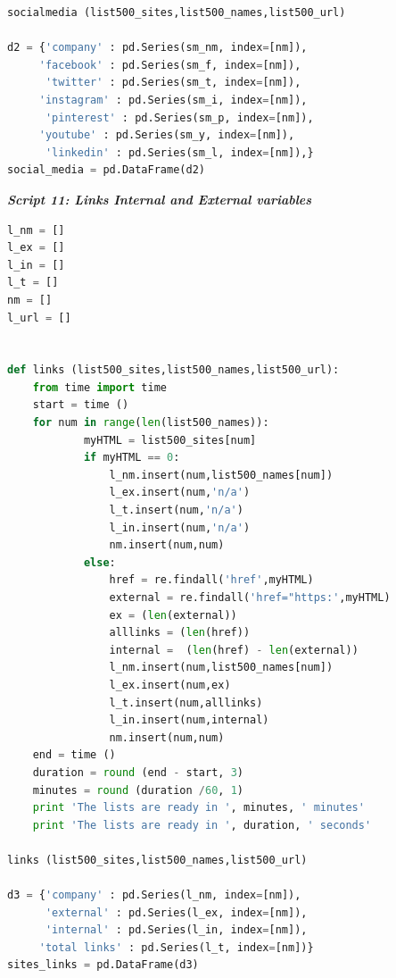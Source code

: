\documentclass{article}
\begin{document}
\begin{lstlisting}[language=Python]
socialmedia (list500_sites,list500_names,list500_url)

d2 = {'company' : pd.Series(sm_nm, index=[nm]),
     'facebook' : pd.Series(sm_f, index=[nm]),
      'twitter' : pd.Series(sm_t, index=[nm]),
     'instagram' : pd.Series(sm_i, index=[nm]),
      'pinterest' : pd.Series(sm_p, index=[nm]),
     'youtube' : pd.Series(sm_y, index=[nm]),
      'linkedin' : pd.Series(sm_l, index=[nm]),}
social_media = pd.DataFrame(d2) 
\end{lstlisting}

\begin{center}
\textit{\textbf{Script 11: Links Internal and External variables}} \label{p11}
\end{center}
\begin{lstlisting}[language=Python]
l_nm = []
l_ex = []
l_in = []
l_t = []
nm = []
l_url = []


def links (list500_sites,list500_names,list500_url):
    from time import time    
    start = time ()
    for num in range(len(list500_names)):        
            myHTML = list500_sites[num]
            if myHTML == 0:
                l_nm.insert(num,list500_names[num])            
                l_ex.insert(num,'n/a')
                l_t.insert(num,'n/a')
                l_in.insert(num,'n/a')
                nm.insert(num,num)                
            else: 
                href = re.findall('href',myHTML)
                external = re.findall('href="https:',myHTML)
                ex = (len(external))
                alllinks = (len(href))
                internal =  (len(href) - len(external))
                l_nm.insert(num,list500_names[num])            
                l_ex.insert(num,ex)
                l_t.insert(num,alllinks)
                l_in.insert(num,internal)
                nm.insert(num,num)                
    end = time ()
    duration = round (end - start, 3)
    minutes = round (duration /60, 1)
    print 'The lists are ready in ', minutes, ' minutes'
    print 'The lists are ready in ', duration, ' seconds'
 
links (list500_sites,list500_names,list500_url)

d3 = {'company' : pd.Series(l_nm, index=[nm]),
      'external' : pd.Series(l_ex, index=[nm]),
      'internal' : pd.Series(l_in, index=[nm]),
     'total links' : pd.Series(l_t, index=[nm])}
sites_links = pd.DataFrame(d3)    
\end{lstlisting}
\end{document}
